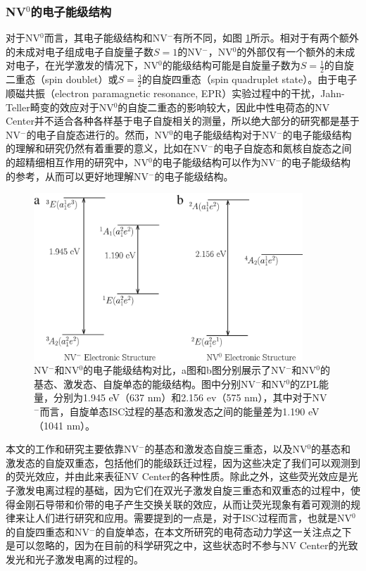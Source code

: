 \documentclass[type = bachelor]{whu-thesis}
\begin{document}
\subsubsection{NV$^0$的电子能级结构}
对于NV$^0$而言，其电子能级结构和NV$^-$有所不同，如图 \ref{fig: NV0 Electronic Structure}所示。相对于有两个额外的未成对电子组成电子自旋量子数$S=1$的NV$^-$，NV$^0$的外部仅有一个额外的未成对电子，在光学激发的情况下，NV$^0$的能级结构可能是自旋量子数为$S=\frac{1}{2}$的自旋二重态（spin doublet）或$S=\frac{3}{2}$的自旋四重态（spin quadruplet state）。由于电子顺磁共振（electron paramagnetic resonance, EPR）实验过程中的干扰，Jahn-Teller畸变的效应对于NV$^0$的自旋二重态的影响较大，因此中性电荷态的NV Center并不适合各种各样基于电子自旋相关的测量，所以绝大部分的研究都是基于NV$^-$的电子自旋态进行的\cite{gali2009theoryoftheneutral}。然而，NV$^0$的电子能级结构对于NV$^-$的电子能级结构的理解和研究仍然有着重要的意义，比如在NV$^-$的电子自旋态和氮核自旋态之间的超精细相互作用的研究中，NV$^0$的电子能级结构可以作为NV$^-$的电子能级结构的参考，从而可以更好地理解NV$^-$的电子能级结构\cite{gali2009theoryoftheneutral}。

\begin{figure}
  \centering
  \includegraphics[width=0.9\textwidth]{figures/Chapter 1/NV0 Electronic Structure.jpg}
  \caption[NV$^-$和NV$^0$的电子能级结构对比]{NV$^-$和NV$^0$的电子能级结构对比，a图和b图分别展示了NV$^-$和NV$^0$的基态、激发态、自旋单态的能级结构。图中分别NV$^-$和NV$^0$的ZPL能量，分别为1.945 eV（637 nm）和2.156 ev（575 nm），其中对于NV$^-$而言，自旋单态ISC过程的基态和激发态之间的能量差为1.190 eV（1041 nm）\cite{doherty2013nitrogen}。}
  \label{fig: NV0 Electronic Structure}
\end{figure}

本文的工作和研究主要依靠NV$^-$的基态和激发态自旋三重态，以及NV$^0$的基态和激发态的自旋双重态，包括他们的能级跃迁过程，因为这些决定了我们可以观测到的荧光效应，并由此来表征NV Center的各种性质。除此之外，这些荧光效应是光子激发电离过程的基础，因为它们在双光子激发自旋三重态和双重态的过程中，使得金刚石导带和价带的电子产生交换关联的效应，从而让荧光现象有着可观测的规律来让人们进行研究和应用\cite{aslam2013photo}。需要提到的一点是，对于ISC过程而言，也就是NV$^0$的自旋四重态和NV$^-$的自旋单态，在本文所研究的电荷态动力学这一关注点之下是可以忽略的，因为在目前的科学研究之中，这些状态时不参与NV Center的光致发光和光子激发电离的过程的。
\end{document}

